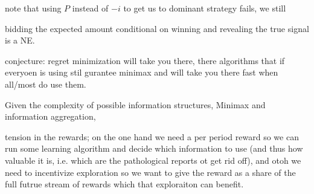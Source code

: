 note that using $P$ instead of $-i$ to get us to dominant strategy fails, we still 

bidding the expected amount conditional on winning and revealing the true signal is a NE.

conjecture: regret minimization will take you there, there algorithms that if everyoen is using stil gurantee minimax and will take you there fast when all/most do use them.

Given the complexity of possible information structures,
Minimax and information aggregation, 








tension in the rewards; on the one hand we need a per period reward so we can run some learning algorithm and decide which information to use (and thus how valuable it is, i.e. which are the pathological reports ot get rid off), and otoh we need to incentivize exploration so we want to give the reward as a share of the full futrue stream of rewards which that exploraiton can benefit.

